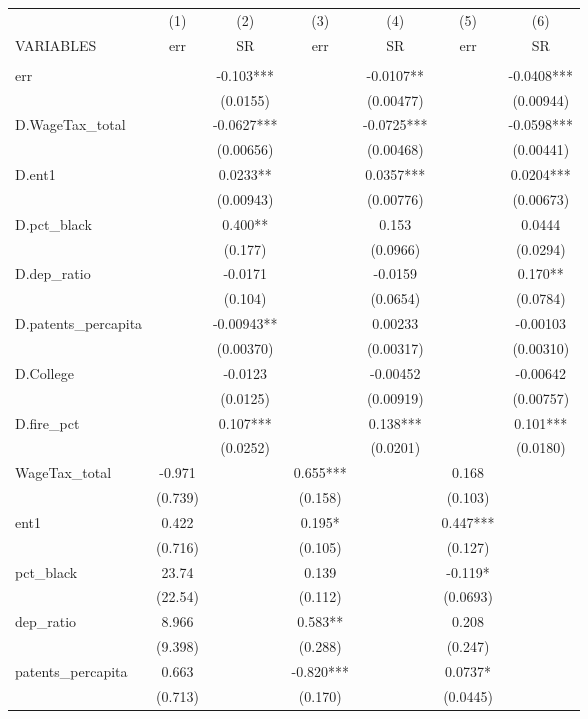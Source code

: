 \begin{tabular}{lcccccc} \hline
 & (1) & (2) & (3) & (4) & (5) & (6) \\
VARIABLES & err & SR & err & SR & err & SR \\ \hline
 &  &  &  &  &  &  \\
err &  & -0.103*** &  & -0.0107** &  & -0.0408*** \\
 &  & (0.0155) &  & (0.00477) &  & (0.00944) \\
D.WageTax\_total &  & -0.0627*** &  & -0.0725*** &  & -0.0598*** \\
 &  & (0.00656) &  & (0.00468) &  & (0.00441) \\
D.ent1 &  & 0.0233** &  & 0.0357*** &  & 0.0204*** \\
 &  & (0.00943) &  & (0.00776) &  & (0.00673) \\
D.pct\_black &  & 0.400** &  & 0.153 &  & 0.0444 \\
 &  & (0.177) &  & (0.0966) &  & (0.0294) \\
D.dep\_ratio &  & -0.0171 &  & -0.0159 &  & 0.170** \\
 &  & (0.104) &  & (0.0654) &  & (0.0784) \\
D.patents\_percapita &  & -0.00943** &  & 0.00233 &  & -0.00103 \\
 &  & (0.00370) &  & (0.00317) &  & (0.00310) \\
D.College &  & -0.0123 &  & -0.00452 &  & -0.00642 \\
 &  & (0.0125) &  & (0.00919) &  & (0.00757) \\
D.fire\_pct &  & 0.107*** &  & 0.138*** &  & 0.101*** \\
 &  & (0.0252) &  & (0.0201) &  & (0.0180) \\
WageTax\_total & -0.971 &  & 0.655*** &  & 0.168 &  \\
 & (0.739) &  & (0.158) &  & (0.103) &  \\
ent1 & 0.422 &  & 0.195* &  & 0.447*** &  \\
 & (0.716) &  & (0.105) &  & (0.127) &  \\
pct\_black & 23.74 &  & 0.139 &  & -0.119* &  \\
 & (22.54) &  & (0.112) &  & (0.0693) &  \\
dep\_ratio & 8.966 &  & 0.583** &  & 0.208 &  \\
 & (9.398) &  & (0.288) &  & (0.247) &  \\
patents\_percapita & 0.663 &  & -0.820*** &  & 0.0737* &  \\
 & (0.713) &  & (0.170) &  & (0.0445) &  \\

\end{tabular}
